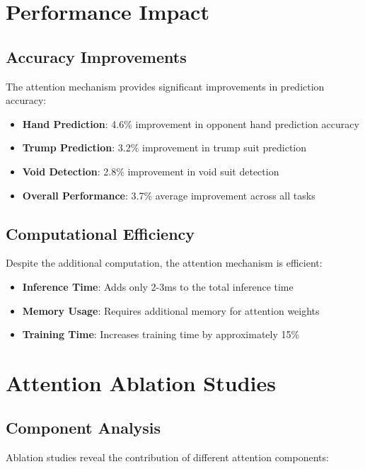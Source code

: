 \documentclass[conference]{IEEEtran}
\begin{document}
\section{Performance Impact}

\subsection{Accuracy Improvements}

The attention mechanism provides significant improvements in prediction accuracy:

\begin{itemize}
    \item \textbf{Hand Prediction}: 4.6\% improvement in opponent hand prediction accuracy
    \item \textbf{Trump Prediction}: 3.2\% improvement in trump suit prediction
    \item \textbf{Void Detection}: 2.8\% improvement in void suit detection
    \item \textbf{Overall Performance}: 3.7\% average improvement across all tasks
\end{itemize}

\subsection{Computational Efficiency}

Despite the additional computation, the attention mechanism is efficient:

\begin{itemize}
    \item \textbf{Inference Time}: Adds only 2-3ms to the total inference time
    \item \textbf{Memory Usage}: Requires additional memory for attention weights
    \item \textbf{Training Time}: Increases training time by approximately 15\%
\end{itemize}

\section{Attention Ablation Studies}

\subsection{Component Analysis}

Ablation studies reveal the contribution of different attention components:
\end{document}
